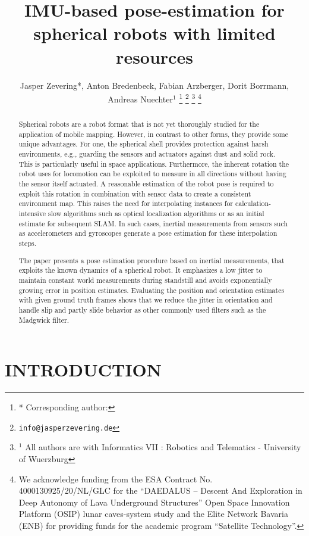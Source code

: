 \documentclass[letterpaper, 10 pt, conference]{ieeeconf}  %
\title{\LARGE \bf
IMU-based pose-estimation for spherical robots with limited resources
}
\author{Jasper Zevering*, Anton Bredenbeck, Fabian Arzberger, Dorit Borrmann, Andreas Nuechter$^{1}$%
\thanks{*
        Corresponding author: }%
        \thanks{ \quad  \tt\small info@jasperzevering.de}%
\thanks{$^{1}$ All authors are with Informatics VII : Robotics and Telematics - University of Wuerzburg}%
\thanks{We acknowledge funding from the ESA Contract No. 4000130925/20/NL/GLC for the ``DAEDALUS -- Descent And Exploration in Deep Autonomy of Lava Underground Structures” Open Space Innovation Platform (OSIP) lunar caves-system study and the Elite Network Bavaria (ENB) for providing funds for the academic program “Satellite Technology''.}
}
\begin{document}
\maketitle
\thispagestyle{empty}
\pagestyle{empty}


\begin{abstract}

Spherical robots are a robot format that is not yet thoroughly studied for the application of mobile mapping.
However, in contrast to other forms, they provide some unique advantages.
For one, the spherical shell provides protection against harsh environments, e.g., guarding the sensors and actuators against dust and solid rock.
This is particularly useful in space applications. 
Furthermore, the inherent rotation the robot uses for locomotion can be exploited to measure in all directions without having the sensor itself actuated.
A reasonable estimation of the robot pose is required to exploit this rotation in combination with sensor data to create a consistent environment map. 
This raises the need for interpolating instances for calculation-intensive slow algorithms such as optical localization algorithms or as an initial estimate for subsequent SLAM.
In such cases,  inertial measurements from sensors such as accelerometers and gyroscopes generate a pose estimation for these interpolation steps.

The paper presents a pose estimation procedure based on inertial measurements, that exploits the known dynamics of a spherical robot. 
It emphasizes a low jitter to maintain constant world measurements during standstill and avoids exponentially growing error in position estimates. 
Evaluating the position and orientation estimates with given ground truth frames shows that we reduce the jitter in orientation and handle slip and partly slide behavior as other commonly used filters such as the Madgwick filter.

\end{abstract}


\section{INTRODUCTION}
\end{document}

